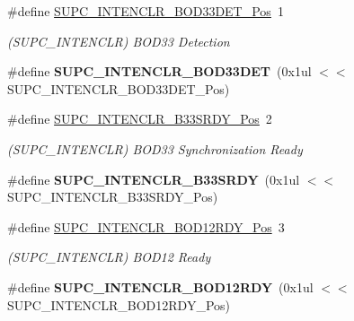 \begin{DoxyCompactItemize}
\item 
\hypertarget{group___s_a_m_l21___s_u_p_c_ga4d834c9e64f232b72df54e3c57a1e856}{}\#define \hyperlink{group___s_a_m_l21___s_u_p_c_ga4d834c9e64f232b72df54e3c57a1e856}{S\+U\+P\+C\+\_\+\+I\+N\+T\+E\+N\+C\+L\+R\+\_\+\+B\+O\+D33\+D\+E\+T\+\_\+\+Pos}~1\label{group___s_a_m_l21___s_u_p_c_ga4d834c9e64f232b72df54e3c57a1e856}

\begin{DoxyCompactList}\small\item\em (S\+U\+P\+C\+\_\+\+I\+N\+T\+E\+N\+C\+L\+R) B\+O\+D33 Detection \end{DoxyCompactList}\item 
\hypertarget{group___s_a_m_l21___s_u_p_c_ga2815d22f9e264a700d2cd9788beec488}{}\#define {\bfseries S\+U\+P\+C\+\_\+\+I\+N\+T\+E\+N\+C\+L\+R\+\_\+\+B\+O\+D33\+D\+E\+T}~(0x1ul $<$$<$ S\+U\+P\+C\+\_\+\+I\+N\+T\+E\+N\+C\+L\+R\+\_\+\+B\+O\+D33\+D\+E\+T\+\_\+\+Pos)\label{group___s_a_m_l21___s_u_p_c_ga2815d22f9e264a700d2cd9788beec488}

\item 
\hypertarget{group___s_a_m_l21___s_u_p_c_gafd5b33166fc69676fd0792359ee79f79}{}\#define \hyperlink{group___s_a_m_l21___s_u_p_c_gafd5b33166fc69676fd0792359ee79f79}{S\+U\+P\+C\+\_\+\+I\+N\+T\+E\+N\+C\+L\+R\+\_\+\+B33\+S\+R\+D\+Y\+\_\+\+Pos}~2\label{group___s_a_m_l21___s_u_p_c_gafd5b33166fc69676fd0792359ee79f79}

\begin{DoxyCompactList}\small\item\em (S\+U\+P\+C\+\_\+\+I\+N\+T\+E\+N\+C\+L\+R) B\+O\+D33 Synchronization Ready \end{DoxyCompactList}\item 
\hypertarget{group___s_a_m_l21___s_u_p_c_gaccd875af2e17b06e61a90c0d2d27118d}{}\#define {\bfseries S\+U\+P\+C\+\_\+\+I\+N\+T\+E\+N\+C\+L\+R\+\_\+\+B33\+S\+R\+D\+Y}~(0x1ul $<$$<$ S\+U\+P\+C\+\_\+\+I\+N\+T\+E\+N\+C\+L\+R\+\_\+\+B33\+S\+R\+D\+Y\+\_\+\+Pos)\label{group___s_a_m_l21___s_u_p_c_gaccd875af2e17b06e61a90c0d2d27118d}

\item 
\hypertarget{group___s_a_m_l21___s_u_p_c_gafdd8d0d73442f24a81692e630668ecdc}{}\#define \hyperlink{group___s_a_m_l21___s_u_p_c_gafdd8d0d73442f24a81692e630668ecdc}{S\+U\+P\+C\+\_\+\+I\+N\+T\+E\+N\+C\+L\+R\+\_\+\+B\+O\+D12\+R\+D\+Y\+\_\+\+Pos}~3\label{group___s_a_m_l21___s_u_p_c_gafdd8d0d73442f24a81692e630668ecdc}

\begin{DoxyCompactList}\small\item\em (S\+U\+P\+C\+\_\+\+I\+N\+T\+E\+N\+C\+L\+R) B\+O\+D12 Ready \end{DoxyCompactList}\item 
\hypertarget{group___s_a_m_l21___s_u_p_c_gadc46112e0544eb11d39bf8caabade9cd}{}\#define {\bfseries S\+U\+P\+C\+\_\+\+I\+N\+T\+E\+N\+C\+L\+R\+\_\+\+B\+O\+D12\+R\+D\+Y}~(0x1ul $<$$<$ S\+U\+P\+C\+\_\+\+I\+N\+T\+E\+N\+C\+L\+R\+\_\+\+B\+O\+D12\+R\+D\+Y\+\_\+\+Pos)\label{group___s_a_m_l21___s_u_p_c_gadc46112e0544eb11d39bf8caabade9cd}


\end{DoxyCompactItemize}
